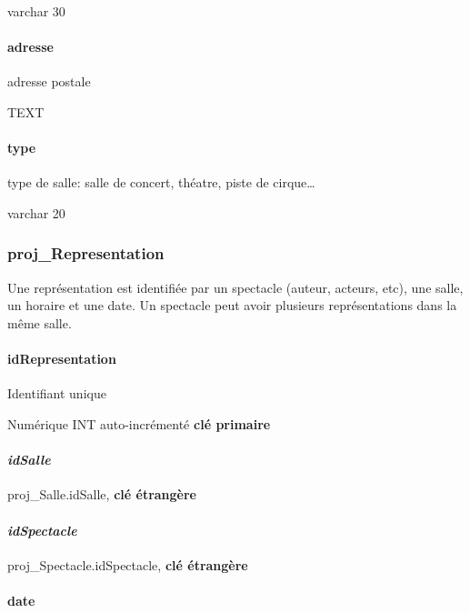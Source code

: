 varchar 30

\paragraph{adresse}\label{adresse}

adresse postale

TEXT

\paragraph{type}\label{type-1}

type de salle: salle de concert, théatre, piste de cirque\ldots{}

varchar 20

\subsubsection{proj\_Representation}\label{projux5frepresentation}

Une représentation est identifiée par un spectacle (auteur, acteurs,
etc), une salle, un horaire et une date. Un spectacle peut avoir
plusieurs représentations dans la même salle.

\paragraph{\texorpdfstring{\textbf{idRepresentation}}{idRepresentation}}\label{idrepresentation}

Identifiant unique

Numérique INT auto-incrémenté \textbf{clé primaire}

\paragraph{\texorpdfstring{\emph{idSalle}}{idSalle}}\label{idsalle-1}

proj\_Salle.idSalle, \textbf{clé étrangère}

\paragraph{\texorpdfstring{\emph{idSpectacle}}{idSpectacle}}\label{idspectacle-1}

proj\_Spectacle.idSpectacle, \textbf{clé étrangère}

\paragraph{date}\label{date}

